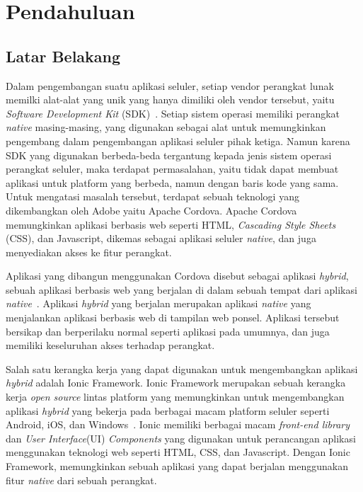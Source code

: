 \chapter{Pendahuluan}
\label{chap:intro}
   
\section{Latar Belakang}
\label{sec:label}

Dalam pengembangan suatu aplikasi seluler, setiap vendor perangkat lunak memilki alat-alat yang unik yang hanya dimiliki oleh vendor tersebut, yaitu \textit{Software Development Kit} (SDK)~\cite{yusuf:16:ionic}. Setiap sistem operasi memiliki perangkat \textit{native} masing-masing, yang digunakan sebagai alat untuk memungkinkan pengembang dalam pengembangan aplikasi seluler pihak ketiga. Namun karena SDK yang digunakan berbeda-beda tergantung kepada jenis sistem operasi perangkat seluler, maka terdapat permasalahan, yaitu tidak dapat membuat aplikasi untuk platform yang berbeda, namun dengan baris kode yang sama. Untuk mengatasi masalah tersebut, terdapat sebuah teknologi yang dikembangkan oleh Adobe yaitu Apache Cordova. Apache Cordova memungkinkan aplikasi berbasis web seperti HTML, {\it Cascading Style Sheets} (CSS), dan Javascript, dikemas sebagai aplikasi seluler \textit{native}, dan juga menyediakan akses ke fitur perangkat.

Aplikasi yang dibangun menggunakan Cordova disebut sebagai aplikasi \textit{hybrid}, sebuah aplikasi berbasis web yang berjalan di dalam sebuah tempat dari aplikasi \textit{native}~\cite{yusuf:16:ionic}. Aplikasi \textit{hybrid} yang berjalan merupakan aplikasi \textit{native} yang menjalankan aplikasi berbasis web di tampilan web ponsel. Aplikasi tersebut bersikap dan berperilaku normal seperti aplikasi pada umumnya, dan juga memiliki keseluruhan akses terhadap perangkat. 

Salah satu kerangka kerja yang dapat digunakan untuk mengembangkan aplikasi \textit{hybrid} adalah Ionic Framework. Ionic Framework merupakan sebuah kerangka kerja {\it open source} lintas platform yang memungkinkan untuk mengembangkan aplikasi \textit{hybrid} yang bekerja pada berbagai macam platform seluler seperti Android, iOS, dan Windows~\cite{waranashiwar:18:ionic}. Ionic memiliki berbagai macam \textit{front-end library} dan \textit{User Interface}(UI) {\it Components} yang digunakan untuk  perancangan aplikasi menggunakan teknologi web seperti HTML, CSS, dan Javascript. Dengan Ionic Framework, memungkinkan sebuah aplikasi yang dapat berjalan menggunakan fitur \textit{native} dari sebuah perangkat. 

